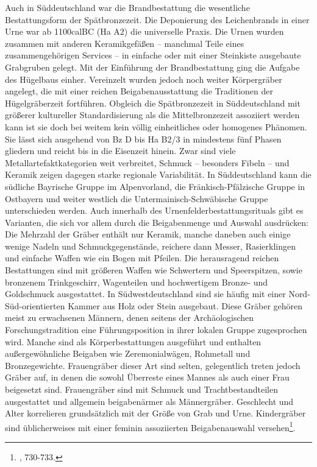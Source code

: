 \documentclass[openany,twoside,twocolumn]{book}
\let\rmarkdownfootnote\footnote%
\def\footnote{\protect\rmarkdownfootnote}
\begin{document}
Auch in Süddeutschland war die Brandbestattung die wesentliche
Bestattungsform der Spätbronzezeit. Die Deponierung des Leichenbrands in
einer Urne war ab 1100calBC (Ha A2) die universelle Praxis. Die Urnen
wurden zusammen mit anderen Keramikgefäßen -- manchmal Teile eines
zusammengehörigen Services -- in einfache oder mit einer Steinkiste
ausgebaute Grabgruben gelegt. Mit der Einführung der Brandbestattung
ging die Aufgabe des Hügelbaus einher. Vereinzelt wurden jedoch noch
weiter Körpergräber angelegt, die mit einer reichen Beigabenausstattung
die Traditionen der Hügelgräberzeit fortführen. Obgleich die
Spätbronzezeit in Süddeutschland mit größerer kultureller
Standardisierung als die Mittelbronzezeit assoziiert werden kann ist sie
doch bei weitem kein völlig einheitliches oder homogenes Phänomen. Sie
lässt sich ausgehend von Bz D bis Ha B2/3 in mindestens fünf Phasen
gliedern und reicht bis in die Eisenzeit hinein. Zwar sind viele
Metallartefaktkategorien weit verbreitet, Schmuck -- besonders Fibeln --
und Keramik zeigen dagegen starke regionale Variabilität. In
Süddeutschland kann die südliche Bayrische Gruppe im Alpenvorland, die
Fränkisch-Pfälzische Gruppe in Ostbayern und weiter westlich die
Untermainisch-Schwäbische Gruppe unterschieden werden. Auch innerhalb
des Urnenfelderbestattungsrituals gibt es Varianten, die sich vor allem
durch die Beigabenmenge und Auswahl ausdrücken: Die Mehrzahl der Gräber
enthält nur Keramik, manche daneben auch einige wenige Nadeln und
Schmuckgegenstände, reichere dann Messer, Rasierklingen und einfache
Waffen wie ein Bogen mit Pfeilen. Die herausragend reichen Bestattungen
sind mit größeren Waffen wie Schwertern und Speerspitzen, sowie
bronzenem Trinkgeschirr, Wagenteilen und hochwertigem Bronze- und
Goldschmuck ausgestattet. In Südwestdeutschland sind sie häufig mit
einer Nord-Süd-orientierten Kammer aus Holz oder Stein ausgebaut. Diese
Gräber gehören meist zu erwachsenen Männern, denen seitens der
Archäologischen Forschungstradition eine Führungsposition in ihrer
lokalen Gruppe zugesprochen wird. Manche sind als Körperbestattungen
ausgeführt und enthalten außergewöhnliche Beigaben wie Zeremonialwägen,
Rohmetall und Bronzegewichte. Frauengräber dieser Art sind selten,
gelegentlich treten jedoch Gräber auf, in denen die sowohl Überreste
eines Mannes als auch einer Frau beigesetzt sind. Frauengräber sind mit
Schmuck und Trachtbestandteilen ausgestattet und allgemein beigabenärmer
als Männergräber. Geschlecht und Alter korrelieren grundsätzlich mit der
Größe von Grab und Urne. Kindergräber sind üblicherweises mit einer
feminin assoziierten Beigabenauswahl versehen\footnote{\textcite{jockenhovel_germany_2013},
  730-733.}.
\end{document}
